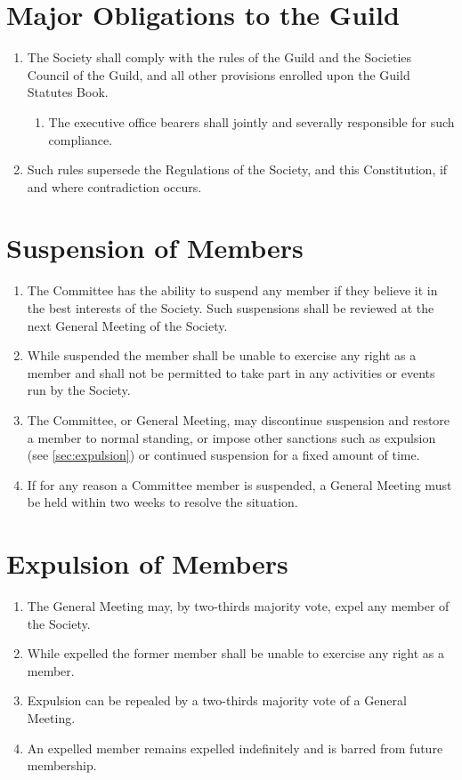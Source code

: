 \documentclass[a4paper]{article}
\newenvironment{enumsection}[1]{\section{#1} \begin{enumerate}[ref=\thesection.\theenumi]}{\end{enumerate}}
\begin{document}
\begin{enumsection}{Major Obligations to the Guild} \label{sec:guild_obligations}
    \item The Society shall comply with the rules of the Guild and the Societies Council of the Guild, and all other provisions enrolled upon the Guild Statutes Book.
    \begin{enumerate}
        \item The executive office bearers shall jointly and severally responsible for such compliance.
    \end{enumerate}
    \item Such rules supersede the Regulations of the Society, and this Constitution, if and where contradiction occurs.
\end{enumsection}

\begin{enumsection}{Suspension of Members} \label{sec:member_suspension}
    \item The Committee has the ability to suspend any member if they believe it in the best interests of the Society. Such suspensions shall be reviewed at the next General Meeting of the Society.
    \item While suspended the member shall be unable to exercise any right as a member and shall not be permitted to take part in any activities or events run by the Society.
    \item The Committee, or General Meeting, may discontinue suspension and restore a member to normal standing, or impose other sanctions such as expulsion (see \cref{sec:expulsion}) or continued suspension for a fixed amount of time.
    \item \label{committee_suspended} If for any reason a Committee member is suspended, a General Meeting must be held within two weeks to resolve the situation.
\end{enumsection}


\begin{enumsection}{Expulsion of Members\label{sec:expulsion}}
    \item The General Meeting may, by two-thirds majority vote, expel any member of the Society.
    \item While expelled the former member shall be unable to exercise any right as a member. 
    \item Expulsion can be repealed by a two-thirds majority vote of a General Meeting.
    \item An expelled member remains expelled indefinitely and is barred from future membership.
\end{enumsection}
\end{document}
